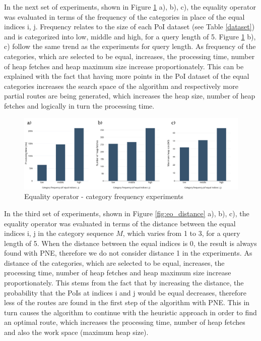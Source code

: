 In the next set of experiments, shown in Figure \ref{fig:eo_frequency} a), b), c), the equality operator was evaluated in terms of the frequency of the categories in place of the equal indices i, j. Frequency relates to the size of each PoI dataset (see Table \ref{dataset}) and is categorized into low, middle and high, for a query length of 5.  Figure \ref{fig:eo_frequency} b), c) follow the same trend as the experiments for query length. 
As frequency of the categories, which are selected to be equal, increases, the processing time, number of heap fetches and heap maximum size increase proportionately. This can be explained with the fact that having more points in the PoI dataset of the equal categories increases the search space of the algorithm and respectively more partial routes are being generated, which increases the heap size, number of heap fetches and logically in turn the processing time.

\begin{figure}[H]
	\includegraphics[scale=0.3]{images/eo_frequency.png}
	\centering
	\caption{Equality operator - category frequency experiments}
	\label{fig:eo_frequency}
\end{figure}

In the third set of experiments, shown in Figure \ref{fig:eo_distance} a), b), c), the equality operator was evaluated in terms of the  distance between the equal indices i, j in the category sequence $M$, which varies from 1 to 3, for a query length of 5. When the distance between the equal indices is 0, the result is always found with PNE, therefore we do not consider distance 1 in the experiments. 
As distance of the categories, which are selected to be equal, increases, the processing time, number of heap fetches and heap maximum size increase proportionately. This stems from the fact that by increasing the distance, the probability that the PoIs at indices i and j would be equal decreases, therefore less of the routes are found in the first step of the algorithm with PNE. This in turn causes the algorithm to continue with the heuristic approach in order to find an optimal route, which increases the processing time, number of heap fetches and also the work space (maximum heap size).

